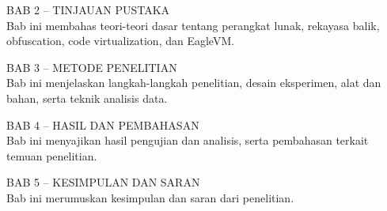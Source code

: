 BAB 2 – TINJAUAN PUSTAKA \\
Bab ini membahas teori-teori dasar tentang perangkat lunak, rekayasa balik, obfuscation, code virtualization, dan EagleVM.

BAB 3 – METODE PENELITIAN \\
Bab ini menjelaskan langkah-langkah penelitian, desain eksperimen, alat dan bahan, serta teknik analisis data.

BAB 4 – HASIL DAN PEMBAHASAN \\
Bab ini menyajikan hasil pengujian dan analisis, serta pembahasan terkait temuan penelitian.

BAB 5 – KESIMPULAN DAN SARAN \\
Bab ini merumuskan kesimpulan dan saran dari penelitian.
